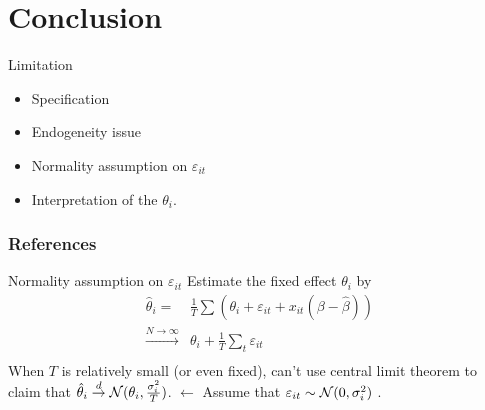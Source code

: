 \documentclass[10pt,mathserif]{beamer}
\begin{document}
\section{Conclusion}

\begin{frame}{Limitation}
  \begin{itemize}\itemsep=12pt
    \item Specification
    \item Endogeneity issue
    \item Normality assumption on $\varepsilon_{it}$
    \item Interpretation of the $\theta_i$.
  \end{itemize}
\end{frame}

\begin{frame}[allowframebreaks]
  \frametitle{References}
  
  
\end{frame}

\appendix

\begin{frame}{Normality assumption on $\varepsilon_{it}$}
  Estimate the fixed effect $\theta_i$ by
  \begin{align*}
    \hat{\theta}_i =                       & \frac{1}{T}\sum(\theta_i+\varepsilon_{it}+x_{it}(\beta-\hat{\beta})) \\
    \overset{N\to \infty}{\longrightarrow} & \theta_i+\frac{1}{T}\sum_t \varepsilon_{it}                          \\
  \end{align*}
  When $T$ is relatively small (or even fixed), can't use central limit theorem to claim that $\hat{\theta}_i \overset{d}{\to} \mathcal{N}(\theta_i,\frac{\sigma_i^2}{T})$.
  $\longleftarrow$ Assume that $\varepsilon_{it} \sim \mathcal{N}(0,\sigma_i^2)$ .

\end{frame}
\end{document}
